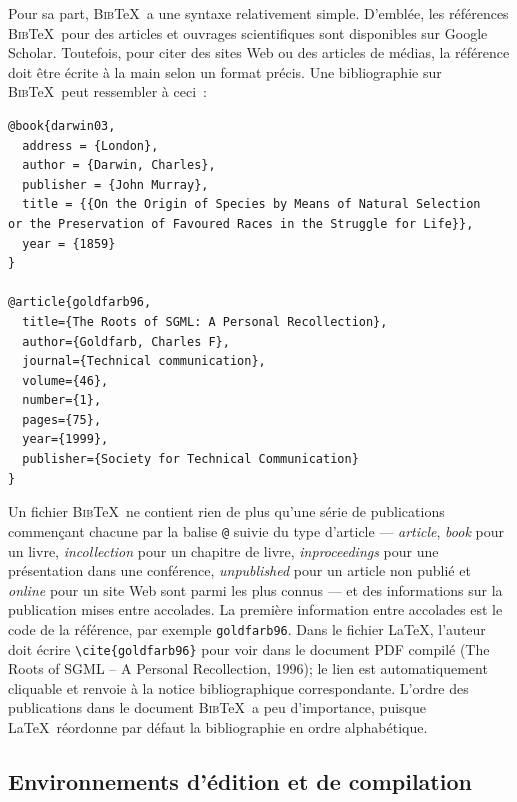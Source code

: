 \documentclass[
  letterpaper,
  DIV=11,
  numbers=noendperiod]{scrreprt}
\begin{document}
Pour sa part, \textsc{Bib}\TeX~a une syntaxe relativement simple.
D'emblée, les références \textsc{Bib}\TeX~pour des articles et ouvrages
scientifiques sont disponibles sur Google Scholar. Toutefois, pour citer
des sites Web ou des articles de médias, la référence doit être écrite à
la main selon un format précis. Une bibliographie sur
\textsc{Bib}\TeX~peut ressembler à ceci~:

\begin{verbatim}
@book{darwin03,
  address = {London},
  author = {Darwin, Charles},
  publisher = {John Murray},
  title = {{On the Origin of Species by Means of Natural Selection
or the Preservation of Favoured Races in the Struggle for Life}},
  year = {1859}
}

@article{goldfarb96,
  title={The Roots of SGML: A Personal Recollection},
  author={Goldfarb, Charles F},
  journal={Technical communication},
  volume={46},
  number={1},
  pages={75},
  year={1999},
  publisher={Society for Technical Communication}
}
\end{verbatim}

Un fichier \textsc{Bib}\TeX~ne contient rien de plus qu'une série de
publications commençant chacune par la balise \texttt{@} suivie du type
d'article --- \emph{article}, \emph{book} pour un livre,
\emph{incollection} pour un chapitre de livre, \emph{inproceedings} pour
une présentation dans une conférence, \emph{unpublished} pour un article
non publié et \emph{online} pour un site Web sont parmi les plus connus
--- et des informations sur la publication mises entre accolades. La
première information entre accolades est le code de la référence, par
exemple \texttt{goldfarb96}. Dans le fichier \LaTeX, l'auteur doit
écrire \texttt{\textbackslash{}cite\{goldfarb96\}} pour voir dans le
document PDF compilé (The {Roots} of {SGML} -- {A Personal
Recollection}, 1996); le lien est automatiquement cliquable et renvoie à
la notice bibliographique correspondante. L'ordre des publications dans
le document \textsc{Bib}\TeX~a peu d'importance, puisque
\LaTeX~réordonne par défaut la bibliographie en ordre alphabétique.

\hypertarget{environnements-duxe9dition-et-de-compilation}{%
\subsection{Environnements d'édition et de
compilation}\label{environnements-duxe9dition-et-de-compilation}}
\end{document}

